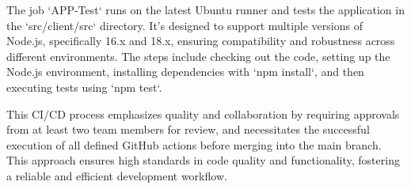 \documentclass{article}
\begin{document}
The job `APP-Test` runs on the latest Ubuntu runner and tests the application in the `src/client/src` directory. 
It's designed to support multiple versions of Node.js, specifically 16.x and 18.x, ensuring compatibility and robustness across different environments. 
The steps include checking out the code, setting up the Node.js environment, installing dependencies with `npm install`, and then executing tests using `npm test`.

This CI/CD process emphasizes quality and collaboration by requiring approvals from at least two team members for review, and necessitates the successful execution of all defined GitHub actions before merging into the main branch. 
This approach ensures high standards in code quality and functionality, fostering a reliable and efficient development workflow.
\end{document}
